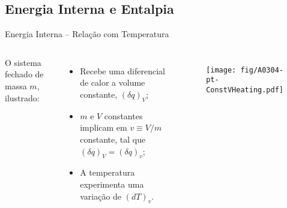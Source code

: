 \subsection{Energia Interna e Entalpia}

    \begin{frame}{Energia Interna -- Relação com Temperatura}\vspace*{-2em}
        \begin{columns}
            O sistema fechado de massa \alert{$m$}, ilustrado:\\[\smallskipamount]
            \begin{itemize}
                \item<1-> Recebe uma diferencial de calor a  volume  constante,  \alert{$(\delta
                    q)_V$};
                \item<2-> \alert{$m$} e \alert{$V$}  constantes  implicam  em  \alert{$v  \equiv
                    V/m$} constante, tal que \alert{$(\delta q)_V = (\delta q)_v$};
                \item<3-> A temperatura experimenta uma variação de \alert{$(dT)_v$}.
            \end{itemize}
            \begin{figure}
                \texttt{[image: fig/A0304-pt-ConstVHeating.pdf]}
            \end{figure}
        \end{columns}
    \end{frame}

